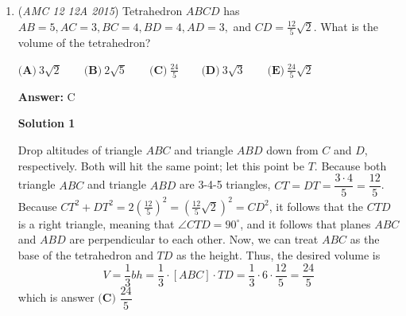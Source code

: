 \begin{enumerate}
\textbf{Solution 5 (Quick and logical)}

This problem becomes substantially easier if our denominator is a power of ten. Notice that:
 \[\frac{123456789}{2^{26}*5^{4}}=\frac{5^{22}*123456789}{10^{26}}\].This means we have $26$ places after the decimal place to work with. If our numerator has at most $26$ places, nothing will "spill over" into the integer side. You can see this via scientific notation. (You can easily stop here because it is rather obvious that the numerator is far smaller than the denominator, so we will have something like $23$ digits after the decimal point). For the sake of rigor, we will confirm our suspicious that we will have 26 places.\newline Let $D(n)$ be the number of digits of n. it is well known that $D(n)\lfloor log(n)\rfloor+1$. You can see this as the $\lfloor log(n)\rfloor$ is the largest power of $10$ less than n. $10^n$ has n+1 digits so since $n\geq \lfloor n \rfloor$, it will also have n+1 digits.\newline Thus:
 \[D(5^{22}*123456789)=\lfloor log(5^{22}*123456789)\rfloor+1 = \lfloor 22log(5)+log(123456789)\rfloor+1\approx\lfloor 22 * 0.7 + 8.1 \rfloor+1 \approx \lfloor 15.4+8.1 \rfloor +1 = 23+1 = 24\]\newline Since $24<26$ we will have no spill over. We will also have 2 zeros in front of a 24 digit number.Thus, our result is 
 \[\boxed{\textbf{(C) }26}\]~Stereotypicalmathnerd

 


	\item (\textit{AMC 12 12A 2015}) Tetrahedron $ABCD$ has $AB=5,AC=3,BC=4,BD=4,AD=3,$ and $CD=\frac{12}{5}\sqrt{2}$. What is the volume of the tetrahedron?


 $\textbf{(A)}\ 3\sqrt{2}\qquad\textbf{(B)}\ 2\sqrt{5}\qquad\textbf{(C)}\ \frac{24}{5}\qquad\textbf{(D)}\ 3\sqrt{3}\qquad\textbf{(E)}\ \frac{24}{5}\sqrt{2}$

 \textbf{Answer: }C



\textbf{Solution 1}

Drop altitudes of triangle $ABC$ and triangle $ABD$ down from $C$ and $D$, respectively. Both will hit the same point; let this point be $T$. Because both triangle $ABC$ and triangle $ABD$ are 3-4-5 triangles, $CT = DT = \dfrac{3\cdot4}{5} = \dfrac{12}{5}$. Because $CT^{2} + DT^{2} = 2\left(\frac{12}{5}\right)^{2} = \left(\frac{12}{5}\sqrt{2}\right)^{2} = CD^{2}$, it follows that the $CTD$ is a right triangle, meaning that $\angle CTD = 90^\circ$, and it follows that planes $ABC$ and $ABD$ are perpendicular to each other. Now, we can treat $ABC$ as the base of the tetrahedron and $TD$ as the height. Thus, the desired volume is 
 \[V = \dfrac{1}{3} bh = \dfrac{1}{3}\cdot[ABC]\cdot TD = \dfrac{1}{3} \cdot 6 \cdot \dfrac{12}{5} = \dfrac{24}{5}\] which is answer $\boxed{\textbf{(C) } \dfrac{24}{5}}$





\end{enumerate}
